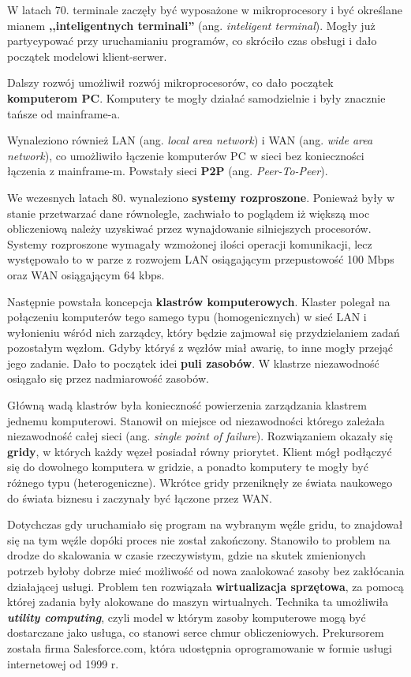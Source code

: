 \documentclass[12pt,a4paper,twoside,titlepage,openright]{book}
\begin{document}
W latach 70. terminale zaczęły być wyposażone w mikroprocesory i być określane mianem \textbf{,,inteligentnych terminali''} (ang. \textit{inteligent terminal}). Mogły już partycypować przy uruchamianiu programów, co skróciło czas obsługi i dało początek modelowi klient-serwer.

Dalszy rozwój umożliwił rozwój mikroprocesorów, co dało początek \textbf{komputerom PC}. Komputery te mogły działać samodzielnie i były znacznie tańsze od mainframe-a.

Wynaleziono również LAN (ang. \textit{local area network}) i WAN (ang. \textit{wide area network}), co umożliwiło łączenie komputerów PC w sieci bez konieczności łączenia z mainframe-m. Powstały sieci \textbf{P2P} (ang. \textit{Peer-To-Peer}).

We wczesnych latach 80. wynaleziono \textbf{systemy rozproszone}. Ponieważ były w stanie przetwarzać dane równolegle, zachwiało to poglądem iż większą moc obliczeniową należy uzyskiwać przez wynajdowanie silniejszych procesorów. Systemy rozproszone wymagały wzmożonej ilości operacji komunikacji, lecz występowało to w parze z rozwojem LAN osiągającym przepustowość 100 Mbps oraz WAN osiągającym 64 kbps.

Następnie powstała koncepcja \textbf{klastrów komputerowych}. Klaster polegał na połączeniu komputerów tego samego typu (homogenicznych) w sieć LAN i wyłonieniu wśród nich zarządcy, który będzie zajmował się przydzielaniem zadań pozostałym węzłom. Gdyby któryś z węzłów miał awarię, to inne mogły przejąć jego zadanie. Dało to początek idei \textbf{puli zasobów}. W klastrze niezawodność osiągało się przez nadmiarowość zasobów.

Główną wadą klastrów była konieczność powierzenia zarządzania klastrem jednemu komputerowi. Stanowił on miejsce od niezawodności którego zależała niezawodność całej sieci (ang. \textit{single point of failure}). Rozwiązaniem okazały się \textbf{gridy}, w których każdy węzeł posiadał równy priorytet. Klient mógł podłączyć się do dowolnego komputera w gridzie, a ponadto komputery te mogły być różnego typu (heterogeniczne). Wkrótce gridy przeniknęły ze świata naukowego do świata biznesu i zaczynały być łączone przez WAN.

Dotychczas gdy uruchamiało się program na wybranym węźle gridu, to znajdował się na tym węźle dopóki proces nie został zakończony. Stanowiło to problem na drodze do skalowania w czasie rzeczywistym, gdzie na skutek zmienionych potrzeb byłoby dobrze mieć możliwość od nowa zaalokować zasoby bez zakłócania działającej usługi. Problem ten rozwiązała \textbf{wirtualizacja sprzętowa}, za pomocą której zadania były alokowane do maszyn wirtualnych. Technika ta umożliwiła \textbf{\textit{utility computing}}, czyli model w którym zasoby komputerowe mogą być dostarczane jako usługa, co stanowi serce chmur obliczeniowych. Prekursorem została firma Salesforce.com, która udostępnia oprogramowanie w formie usługi internetowej od 1999 r.
\end{document}
